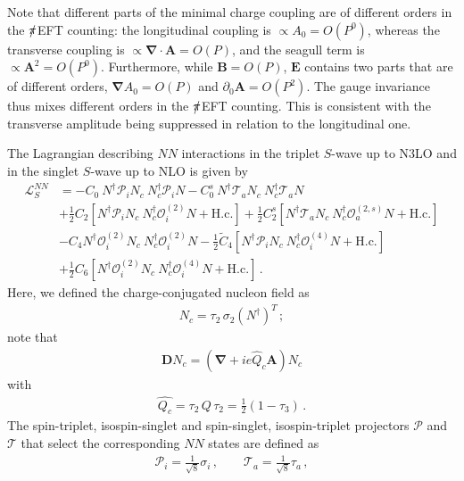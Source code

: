 \documentclass[prl,
twocolumn,
showpacs,preprintnumbers,amsmath,amssymb,
superscriptaddress,
a4paper,nofootinbib,longbibliography]{revtex4-2}
\def\bv#1{\boldsymbol{#1}}
\def\piEFT/{$\slashed{\pi}$EFT}
\begin{document}
Note that different parts of the minimal charge coupling are of different orders in the \piEFT/ counting: the longitudinal coupling is $\propto A_0=O(P^0)$, whereas the transverse coupling is $\propto \bv{\nabla}\cdot\bv{A}=O(P)$, and the seagull term is $\propto \bv{A}^2=O(P^0)$. Furthermore, while $\bv{B}=O(P)$, $\bv{E}$ contains two parts that are of different orders, $\bv{\nabla}A_0=O(P)$ and $\partial_0\bv{A}=O(P^2)$. The gauge invariance thus mixes different orders in the \piEFT/ counting. This is consistent with the transverse amplitude being suppressed in relation to the longitudinal one.

The Lagrangian describing $NN$ interactions in the triplet $S$-wave up to N3LO and in the singlet $S$-wave up to NLO is given by
\begin{align}
\mathcal{L}^{NN}_S&=-C_0\ N^\dagger \mathcal{P}_i N_c \ N^\dagger_c \mathcal{P}_i N
-C_0^s\ N^\dagger \mathcal{T}_a N_c \ N^\dagger_c \mathcal{T}_a N
\nonumber \\
&+
 \frac{1}{2}C_2\left[N^\dagger \mathcal{P}_i N_c\ N^\dagger_c \mathcal{O}^{(2)}_i N+ \mathrm{H.c.} 
\right]
+
 \frac{1}{2}C_2^s\left[N^\dagger \mathcal{T}_a N_c\ N^\dagger_c \mathcal{O}^{(2,s)}_a N+ \mathrm{H.c.} 
\right]
\nonumber\\
&-C_4
N^\dagger \mathcal{O}^{(2)}_i N_c
\ N^\dagger_c \mathcal{O}^{(2)}_i N
-\frac{1}{2}\tilde{C}_4\left[N^\dagger \mathcal{P}_i N_c\ N_c^\dagger \mathcal{O}^{(4)}_i N + \mathrm{H.c.}\right]
\nonumber \\\
&+\frac{1}{2}C_6\left[N^\dagger \mathcal{O}^{(2)}_i N_c\ N_c^\dagger \mathcal{O}^{(4)}_i N + \mathrm{H.c.}
\right] \,.
\label{eq:LagNN}
\end{align}
Here, we defined the charge-conjugated nucleon field as
\begin{align}
    N_c = \tau_2\,\sigma_2 \left(N^\dagger\right)^T\,;
\end{align}
note that
\begin{align}
\bv{D}N_c = \left(\bv{\nabla}+i e\hat{Q}_c \bv{A}\right)N_c
\end{align}
with
\begin{align}
    \hat{Q_c} = \tau_2\, Q\,\tau_2 = \frac{1}{2}(1-\tau_3)\,.
\end{align}
The spin-triplet, isospin-singlet and spin-singlet, isospin-triplet projectors $\mathcal{P}$ and $\mathcal{T}$ that select the corresponding $NN$ states are defined as
\begin{align}
    \mathcal{P}_i = \frac{1}{\sqrt{8}}\sigma_i\,,\qquad \mathcal{T}_a = \frac{1}{\sqrt{8}}\tau_a\,,
\end{align}
\end{document}
